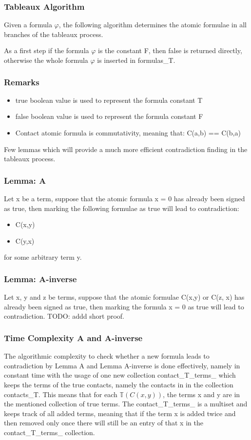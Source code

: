 \documentclass{article}
\begin{document}
		\subsubsection*{Tableaux Algorithm}
			Given a formula $\varphi$, the following algorithm determines the atomic formulae in all branches of the tableaux process.

			As a first step if the formula $\varphi$ is the constant F, then false is returned directly, otherwise the whole formula $\varphi$ is inserted in formulas\_T.
		\newline
			\subsubsection*{Remarks}
			\begin{itemize}
				\item true boolean value is used to represent the formula constant T
				\item false boolean value is used to represent the formula constant F
				\item Contact atomic formula is commutativity, meaning that: C(a,b) == C(b,a)
			\end{itemize}
			Few lemmas which will provide a much more efficient contradiction finding in the tableaux process.
			\subsubsection*{Lemma: A}
				Let x be a term, suppose that the atomic formula x = 0 has already been signed as true,
				then marking the following formulae as true will lead to contradiction:
				\begin{itemize}
					\item C(x,y)
					\item C(y,x)
				\end{itemize}
				for some arbitrary term y.

			\subsubsection*{Lemma: A-inverse}
				Let x, y and z be terms, suppose that the atomic formulae C(x,y) or C(z, x) has already been signed as true,
				then marking the formula x = 0 as true will lead to contradiction.
				\newline
				TODO: addd short proof.
			\subsubsection*{Time Complexity A and A-inverse} 
				The algorithmic complexity to check whether a new formula leads to contradiction by Lemma A and Lemma A-inverse is done
				effectively, namely in constant time with the usage of one new collection contact\_T\_terms\_ which keeps the terms of 
				the true contacts, namely the contacts in in the collection contacts\_T. This means that for each $\mathbb{T}(C(x, y))$, the 
				terms x and y are in the mentioned collection of true terms. The contact\_T\_terms\_  is a multiset and keeps track 
				of all added terms, meaning that if the term x is added twice and then removed only once there will still be an entry of 
				that x in the contact\_T\_terms\_ collection.
				
\end{document}
